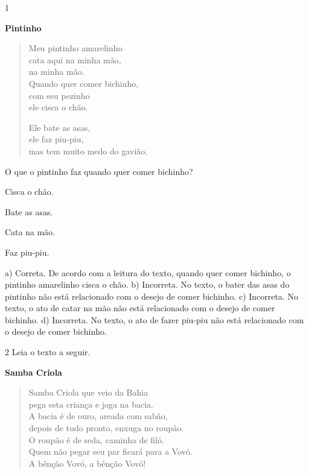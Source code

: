 
\num{1}

\textbf{Pintinho}

\begin{verse}
Meu pintinho amarelinho\\
cata aqui na minha mão,\\ 
na minha mão.\\
Quando quer comer bichinho,\\ 
com seu pezinho\\ 
ele cisca o chão.

Ele bate as asas,\\
ele faz piu-piu,\\ 
mas tem muito medo do gavião.
\end{verse}


O que o pintinho faz quando quer comer bichinho?

\begin{minipage}{.5\textwidth}
\begin{escolha}
	\item Cisca o chão.

	\item Bate as asas.

	\item Cata na mão.

	\item Faz piu-piu.
\end{escolha}
\end{minipage}

a) Correta. De acordo com a leitura do texto, quando quer comer
bichinho, o pintinho amarelinho cisca o chão.
b) Incorreta. No texto, o bater das asas do pintinho não está 
relacionado com o desejo de comer bichinho.
c) Incorreta. No texto, o ato de catar na mão não está 
relacionado com o desejo de comer bichinho.
d) Incorreta. No texto, o ato de fazer piu-piu não está 
relacionado com o desejo de comer bichinho.

\num{2} Leia o texto a seguir.

\textbf{Samba Criola}

\begin{verse}
Samba Criola que veio da Bahia\\
pega esta criança e joga na bacia.\\
A bacia é de ouro, areada com sabão,\\
depois de tudo pronto, enxuga no roupão.\\
O roupão é de seda, caminha de filó.\\
Quem não pegar seu par ficará para a Vovó.\\
A bênção Vovó, a bênção Vovó!
\end{verse}

